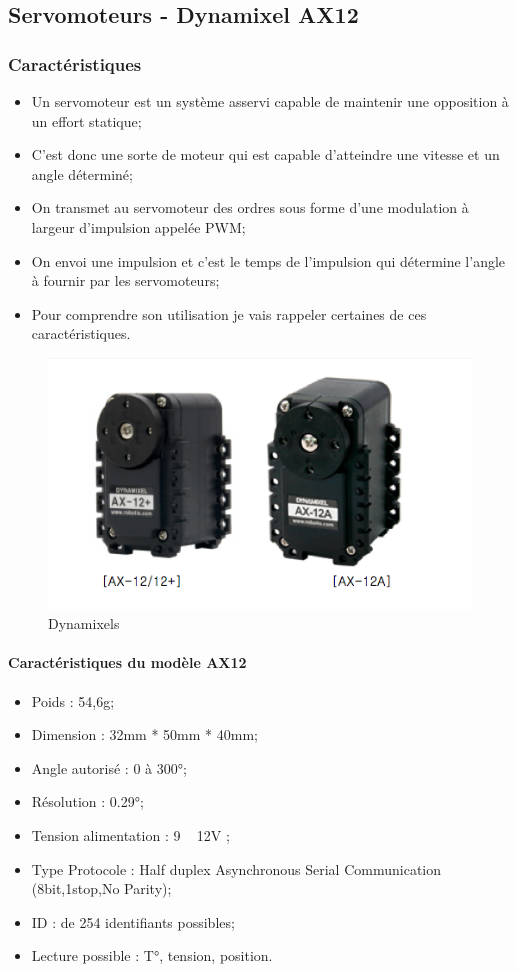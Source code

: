 \subsection{Servomoteurs - Dynamixel AX12}
\subsubsection{Caractéristiques}
\begin{itemize}
    \item Un servomoteur est un système asservi capable de maintenir une opposition à un effort statique; 
    \item C’est donc une sorte de moteur qui est capable d’atteindre une vitesse et un angle déterminé;
    \item On transmet au servomoteur des ordres sous forme d'une modulation à largeur d’impulsion appelée PWM;
    \item On envoi une impulsion et c’est le temps de l’impulsion qui détermine l’angle à fournir par les servomoteurs;
    \item Pour comprendre son utilisation je vais rappeler certaines de ces caractéristiques.
\end{itemize}

\begin{figure}[!ht]
    \centering
    \includegraphics[scale=0.5]{AX.png}
    \caption{Dynamixels}
    \label{img:AX12}
\end{figure}

\paragraph{Caractéristiques du modèle AX12}
\begin{itemize}
    \item Poids : 54,6g;
    \item Dimension : 32mm * 50mm * 40mm;
    \item Angle autorisé : 0 à 300°;
    \item Résolution : 0.29°;
    \item Tension alimentation : 9 ~ 12V ;
    \item Type Protocole : Half duplex Asynchronous Serial Communication (8bit,1stop,No Parity);
    \item ID : de 254 identifiants possibles;
    \item Lecture possible : T°, tension, position.
\end{itemize}

